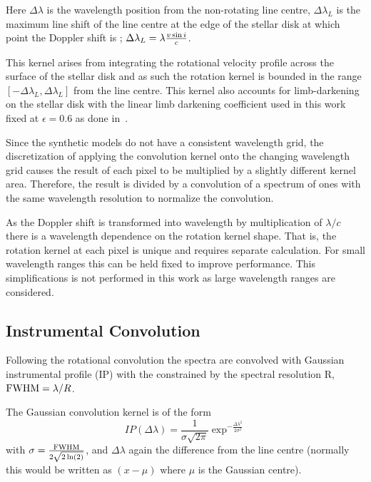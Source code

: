 Here $\Delta\lambda$ is the wavelength position from the non-rotating line centre, $\Delta\lambda_{L}$ is the maximum line shift of the line centre at the edge of the stellar disk at which point the Doppler shift is  \Vsini{}; $\Delta\lambda_{L} = \lambda \frac{v\sin{i}}{c}$.

This kernel arises from integrating the rotational velocity profile across the surface of the stellar disk and as such the rotation kernel is bounded in the range  $[-\Delta\lambda_L, \Delta\lambda_{L}]$ from the line centre.
This kernel also accounts for limb-darkening on the stellar disk with the linear limb darkening coefficient used in this work fixed at $\epsilon=0.6$ as done in~\citet{figueira_radial_2016}.

Since the synthetic models do not have a consistent wavelength grid, the discretization of applying the convolution kernel onto the changing wavelength grid causes the result of each pixel to be multiplied by a slightly different kernel area.
Therefore, the result is divided by a convolution of a spectrum of ones with the same wavelength resolution to normalize the convolution.

As the Doppler shift \Vsini{} is transformed into wavelength by multiplication of $\lambda  / c$ there is a wavelength dependence on the rotation kernel shape.
That is, the rotation kernel at each pixel is unique and requires separate calculation.
For small wavelength ranges this can be held fixed to improve performance.
This simplifications is not performed in this work as large wavelength ranges are considered.


\subsection{Instrumental Convolution}
Following the rotational convolution the spectra are convolved with Gaussian instrumental profile ({\textrm{IP}}) with the {\fwhm}  constrained by the spectral resolution R, $\textrm{FWHM}= \lambda/R$.

The Gaussian convolution kernel is of the form
\begin{equation}
IP(\Delta\lambda) = \frac{1}{\sigma \sqrt{2\pi}} \exp^{-\frac{{\Delta\lambda}^{2}}{2 {\sigma}^{2}}}
\label{eqn:IP_profile}
\end{equation}
with $\sigma = \frac{\textrm{FWHM}}{2\sqrt{2 \ln(2)}}$, and $\Delta \lambda$ again the difference from the line centre (normally this would be written as $(x-\mu)$ where $\mu$ is the Gaussian centre).

